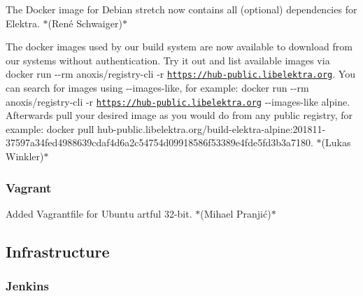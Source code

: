\begin{DoxyItemize}
\item The Docker image for Debian stretch now contains all (optional) dependencies for Elektra. $\ast$(René Schwaiger)$\ast$
\item The docker images used by our build system are now available to download from our systems without authentication. Try it out and list available images via {\ttfamily docker run -\/-\/rm anoxis/registry-\/cli -\/r \href{https://hub-public.libelektra.org}{\tt https\+://hub-\/public.\+libelektra.\+org}}. You can search for images using {\ttfamily -\/-\/images-\/like}, for example\+: {\ttfamily docker run -\/-\/rm anoxis/registry-\/cli -\/r \href{https://hub-public.libelektra.org}{\tt https\+://hub-\/public.\+libelektra.\+org} -\/-\/images-\/like alpine}. Afterwards pull your desired image as you would do from any public registry, for example\+: {\ttfamily docker pull hub-\/public.\+libelektra.\+org/build-\/elektra-\/alpine\+:201811-\/37597a34fed4988639cdaf4d6a2c54754d09918586f53389e4fde5fd3b3a7180}. $\ast$(Lukas Winkler)$\ast$
\end{DoxyItemize}

\subsubsection*{Vagrant}


\begin{DoxyItemize}
\item Added Vagrantfile for Ubuntu artful 32-\/bit. $\ast$(Mihael Pranjić)$\ast$
\end{DoxyItemize}

\subsection*{Infrastructure}

\subsubsection*{Jenkins}


